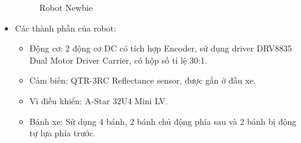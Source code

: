 \begin{itemize}
\begin{figure}[H]
\begin{subfigure}{0.7\textwidth}
            \label{chap1_pic12b}
            \end{subfigure}
            \caption{Robot Newbie}
            \label{chap1_pic12}
        \end{figure}
        \item Các thành phần của robot:
            \begin{itemize}[label=\textendash]
                \item Động cơ: 2 động cơ DC có tích hợp Encoder, sử dụng driver DRV8835 Dual Motor Driver Carrier, có hộp số tỉ lệ 30:1.
                \item Cảm biến:  QTR-3RC Reflectance sensor, được gắn ở đầu xe.
                \item Vi điều khiển: 	A-Star 32U4 Mini LV.
                \item Bánh xe: Sử dụng 4 bánh, 2 bánh chủ động phía sau và 2 bánh bị động tự lựa phía trước.
            \end{itemize}
    \end{itemize}



